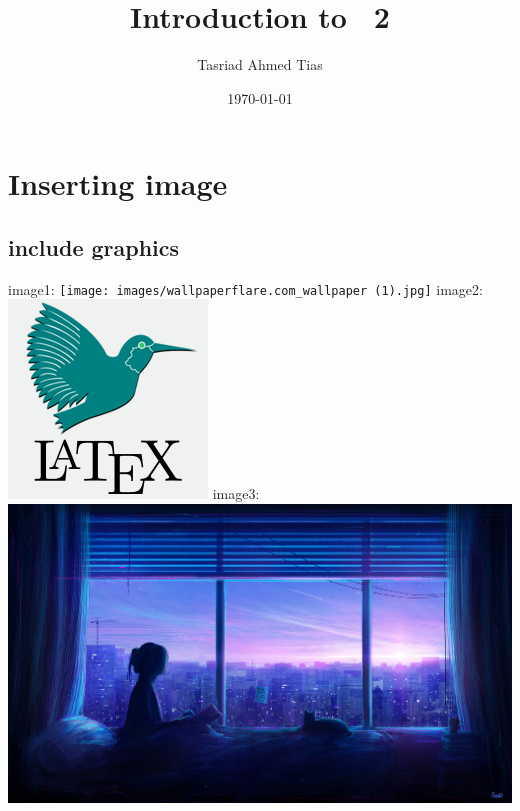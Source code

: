 \documentclass[14pt]{article}
\title{Introduction to \latex\ 2}
\author{Tasriad Ahmed Tias}
\date{\today}
\begin{document}
    \maketitle

    \tableofcontents
    \listoffigures
    \pagebreak
    \section{Inserting image}
    \subsection{include graphics}
    image1:\newline
    \texttt{[image: images/wallpaperflare.com\_wallpaper (1).jpg]}
    image2:\newline
    \includegraphics[angle=90]{images/latex-tutorial.png}
    \newpage
    image3:\newline
    \includegraphics[width=\textwidth]{images/wallpaperflare.com_wallpaper (4).jpg}
\end{document}
